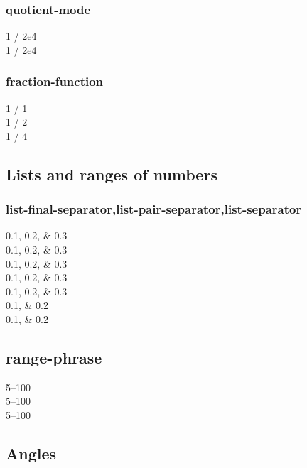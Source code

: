 \documentclass{article}
\begin{document}
\subsubsection{quotient-mode}
\num{1 / 2e4} \\
\num[quotient-mode = fraction]{1 / 2e4}\\

\subsubsection{fraction-function}
{
\num{1 / 1}\\
\num[fraction-function= \dfrac]{1 / 2}\\
\num[fraction-function= \tfrac]{1 / 4}\\
}

\subsection{Lists and ranges of numbers}
\subsubsection{list-final-separator,list-pair-separator,list-separator}
\numlist{0.1;0.2;0.3}\\
\numlist[color=blue]{0.1;0.2;0.3}\\
\numlist[list-separator = {; }]{0.1;0.2;0.3}\\
\numlist[list-final-separator = {, }]{0.1;0.2;0.3} \\
\numlist[
list-separator
= { and },
list-final-separator = { and finally }
]{0.1;0.2;0.3} \\
\numlist{0.1;0.2} \\
\numlist[list-pair-separator = {, and }]{0.1;0.2}\\

\subsection{range-phrase}

\numrange{5}{100} \\
\numrange[range-phrase = --]{5}{100}\\
\numrange[color=blue,range-phrase = --]{5}{100}\\

\subsection{Angles}
\end{document}
